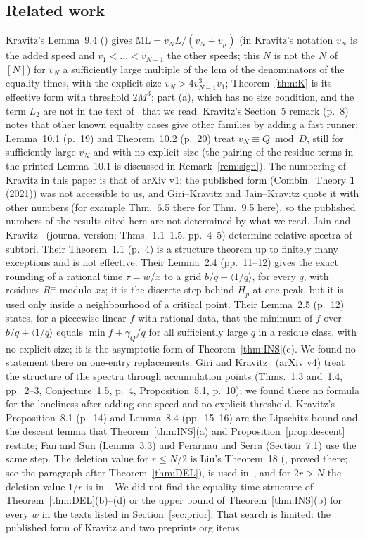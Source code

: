\documentclass[11pt]{article}
\theoremstyle{definition}
\theoremstyle{remark}
\newcommand{\ML}{\mathrm{ML}}
\begin{document}
\subsection{Related work}
Kravitz's Lemma~9.4 (\cite[statement p.~16, proof pp.~17--18]{K}) gives $\ML=v_NL/(v_N+v_\mu)$ (in Kravitz\textquoteright s notation $v_N$ is the added speed and $v_1<\dots<v_{N-1}$ the other speeds; this $N$ is not the $N$ of $[N]$) for $v_N$ a sufficiently large multiple of the lcm of the denominators of the equality times, with the explicit size $v_N>4v_{N-1}^3v_1$; Theorem~\ref{thm:K} is its effective form with threshold $2M^3$; part (a), which has no size condition, and the term $L_2$ are not in the text of~\cite{K} that we read. Kravitz's Section~5 remark (p.~8) notes that other known equality cases give other families by adding a fast runner; Lemma~10.1 (p.~19) and Theorem~10.2 (p.~20) treat $v_N\equiv Q\bmod D$, still for sufficiently large $v_N$ and with no explicit size (the pairing of the residue terms in the printed Lemma~10.1 is discussed in Remark~\ref{rem:sign}). The numbering of Kravitz in this paper is that of arXiv v1; the published form (Combin.\ Theory \textbf{1} (2021)) was not accessible to us, and Giri--Kravitz and Jain--Kravitz quote it with other numbers (for example Thm.~6.5 there for Thm.~9.5 here), so the published numbers of the results cited here are not determined by what we read. Jain and Kravitz~\cite{JK} (journal version; Thms.~1.1--1.5, pp.~4--5) determine relative spectra of subtori. Their Theorem~1.1 (p.~4) is a structure theorem up to finitely many exceptions and is not effective. Their Lemma~2.4 (pp.~11--12) gives the exact rounding of a rational time $\tau=w/x$ to a grid $b/q+\langle1/q\rangle$, for every $q$, with residues $R^\pm$ modulo $xz$; it is the discrete step behind $H_p$ at one peak, but it is used only inside a neighbourhood of a critical point. Their Lemma~2.5 (p.~12) states, for a piecewise-linear $f$ with rational data, that the minimum of $f$ over $b/q+\langle1/q\rangle$ equals $\min f+\gamma_Q/q$ for all sufficiently large $q$ in a residue class, with no explicit size; it is the asymptotic form of Theorem~\ref{thm:INS}(c). We found no statement there on one-entry replacements. Giri and Kravitz~\cite{GK} (arXiv v4) treat the structure of the spectra through accumulation points (Thms.~1.3 and~1.4, pp.~2--3, Conjecture~1.5, p.~4, Proposition~5.1, p.~10); we found there no formula for the loneliness after adding one speed and no explicit threshold. Kravitz's Proposition~8.1 (p.~14) and Lemma~8.4 (pp.~15--16) are the Lipschitz bound and the descent lemma that Theorem~\ref{thm:INS}(a) and Proposition~\ref{prop:descent} restate; Fan and Sun (Lemma~3.3) and Perarnau and Serra (Section~7.1) use the same step. The deletion value for $r\le N/2$ is Liu's Theorem~18 (\cite[p.~16, proof pp.~16--17]{L}, proved there; see the paragraph after Theorem~\ref{thm:DEL}), is used in~\cite[Thm.~2.9, 2.11]{Z}, and for $2r>N$ the deletion value $1/r$ is in~\cite{R1337}. We did not find the equality-time structure of Theorem~\ref{thm:DEL}(b)--(d) or the upper bound of Theorem~\ref{thm:INS}(b) for every $w$ in the texts listed in Section~\ref{sec:prior}. That search is limited: the published form of Kravitz and two preprints.org items 
\end{document}
